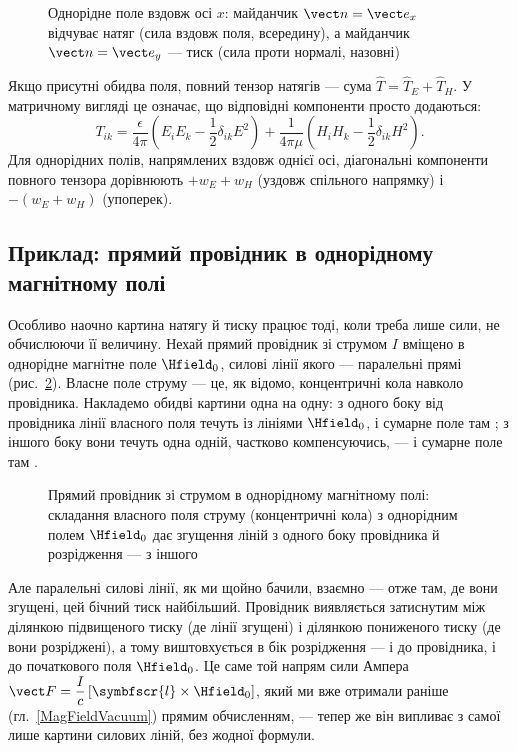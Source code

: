 \begin{figure}[h!]\centering
	\caption{Однорідне поле вздовж осі $x$: майданчик $\vect n=\vect e_x$ відчуває натяг (сила вздовж поля, всередину), а
		майданчик $\vect n=\vect e_y$ --- тиск (сила проти нормалі, назовні)\label{pic:StressDecoding}}
\end{figure}

\begin{Attention}
	Якщо присутні обидва поля, повний тензор натягів --- сума $\hat{T}=\hat{T}_E+\hat{T}_H$. У матричному вигляді це означає, що
	відповідні компоненти просто додаються:
	\begin{equation*}
		T_{ik} = \frac{\epsilon}{4\pi}\left(E_iE_k - \frac12\delta_{ik}E^2\right)
		+ \frac{1}{4\pi\mu}\left(H_iH_k - \frac12\delta_{ik}H^2\right).
	\end{equation*}
	Для однорідних полів, напрямлених вздовж однієї осі, діагональні компоненти повного тензора дорівнюють $+w_E+w_H$ (уздовж спільного
	напрямку) і $-(w_E+w_H)$ (упоперек).
\end{Attention}

\subsection*{Приклад: прямий провідник в однорідному магнітному полі}

Особливо наочно картина натягу й тиску працює тоді, коли треба лише  сили, не обчислюючи її величину. Нехай прямий
провідник зі струмом $I$ вміщено в однорідне магнітне поле $\Hfield_0$, силові лінії якого --- паралельні прямі (рис.~\ref{pic:WireInField}).
Власне поле струму --- це, як відомо, концентричні кола навколо провідника. Накладемо обидві картини одна на одну: з одного боку від провідника
лінії власного поля течуть  із лініями $\Hfield_0$, і сумарне поле там ; з іншого боку вони течуть
 одна одній, частково компенсуючись, --- і сумарне поле там .

\begin{figure}[h!]\centering
	\caption{Прямий провідник зі струмом в однорідному магнітному полі: складання власного поля струму (концентричні кола) з
		однорідним полем $\Hfield_0$ дає згущення ліній з одного боку провідника й розрідження --- з іншого\label{pic:WireInField}}
\end{figure}

Але паралельні силові лінії, як ми щойно бачили, взаємно  --- отже там, де вони згущені, цей бічний тиск
найбільший. Провідник виявляється затиснутим між ділянкою підвищеного тиску (де лінії згущені) і ділянкою пониженого тиску (де вони розріджені),
а тому виштовхується в бік розрідження ---  і до провідника, і до початкового поля $\Hfield_0$. Це саме той напрям сили
Ампера $\vect F = \dfrac{I}{c}\left[\symbfscr{l}\times\Hfield_0\right]$, який ми вже отримали раніше (гл.~\ref{MagFieldVacuum}) прямим
обчисленням, --- тепер же він випливає з самої лише картини силових ліній, без жодної формули.

